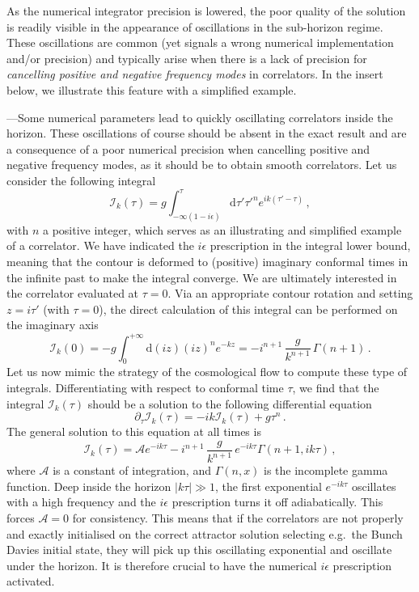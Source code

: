 \documentclass[11pt]{article}
\numberwithin{equation}{section} %
\def \d {\mathrm{d}}
\def \I {\mathcal{I}}
\begin{document}
\vskip 4pt
As the numerical integrator precision is lowered, the poor quality of the solution is readily visible in the appearance of oscillations in the sub-horizon regime. These oscillations are common (yet signals a wrong numerical implementation and/or precision) and typically arise when there is a lack of precision for \textit{cancelling positive and negative frequency modes} in correlators. In the insert below, we illustrate this feature with a simplified example. 

\begin{framed}
{\small {}---Some numerical parameters lead to quickly oscillating correlators inside the horizon. These oscillations of course should be absent in the exact result and are a consequence of a poor numerical precision when cancelling positive and negative frequency modes, as it should be to obtain smooth correlators. Let us consider the following integral
\begin{equation}
    \I_k(\tau) = g \int_{-\infty(1-i\epsilon)}^\tau \d\tau' \tau'^n e^{ik(\tau' - \tau)}\,,
\end{equation}
with $n$ a positive integer, which serves as an illustrating and simplified example of a correlator. We have indicated the $i\epsilon$ prescription in the integral lower bound, meaning that the contour is deformed to (positive) imaginary conformal times in the infinite past to make the integral converge. We are ultimately interested in the correlator evaluated at $\tau=0$. Via an appropriate contour rotation and setting $z = i\tau'$ (with $\tau = 0$), the direct calculation of this integral can be performed on the imaginary axis
\begin{equation}
\label{eq: iepsilon simple example}
    \I_k(0) = -g \int_0^{+\infty}\d (iz) (iz)^n e^{-k z} = -i^{n+1} \,\frac{g}{k^{n+1}} \,\Gamma(n+1)\,.
\end{equation}
Let us now mimic the strategy of the cosmological flow to compute these type of integrals. Differentiating with respect to conformal time $\tau$, we find that the integral $\I_k(\tau)$ should be a solution to the following differential equation
\begin{equation}
    \partial_\tau \I_k(\tau) = -ik \I_k(\tau) + g \tau^n\,.
\end{equation}
The general solution to this equation at all times is
\begin{equation}
\label{eq: iepsilon general solution}
    \I_k(\tau) = \mathcal{A} e^{-ik\tau} - i^{n+1}\, \frac{g}{k^{n+1}}\, e^{-ik\tau} \Gamma(n+1, ik\tau)\,,
\end{equation}
where $\mathcal{A}$ is a constant of integration, and $\Gamma(n, x)$ is the incomplete gamma function. Deep inside the horizon $|k\tau|\gg1$, the first exponential $e^{-ik\tau}$ oscillates with a high frequency and the $i\epsilon$ prescription turns it off adiabatically. This forces $\mathcal{A} = 0$ for consistency. This means that if the correlators are not properly and exactly initialised on the correct attractor solution selecting e.g.~the Bunch Davies initial state, they will pick up this oscillating exponential and oscillate under the horizon. It is therefore crucial to have the numerical $i\epsilon$ prescription activated. 

}
\end{framed}
\end{document}
